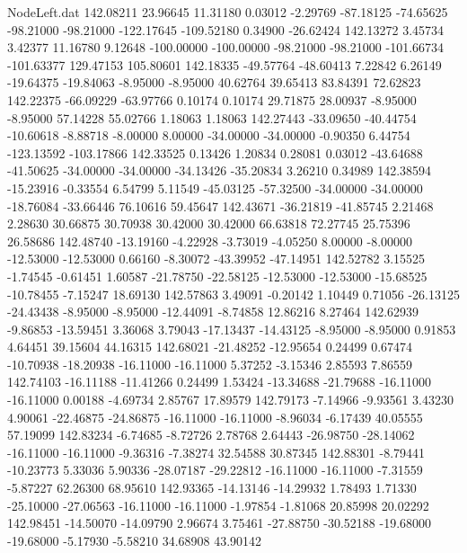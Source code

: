 \begin{filecontents}{NodeLeft.dat}
 142.08211   23.96645   11.31180     0.03012   -2.29769  -87.18125  -74.65625  -98.21000  -98.21000 -122.17645 -109.52180    0.34900  -26.62424
 142.13272    3.45734    3.42377    11.16780    9.12648 -100.00000 -100.00000  -98.21000  -98.21000 -101.66734 -101.63377  129.47153  105.80601
 142.18335  -49.57764  -48.60413     7.22842    6.26149  -19.64375  -19.84063   -8.95000   -8.95000   40.62764   39.65413   83.84391   72.62823
 142.22375  -66.09229  -63.97766     0.10174    0.10174   29.71875   28.00937   -8.95000   -8.95000   57.14228   55.02766    1.18063    1.18063
 142.27443  -33.09650  -40.44754   -10.60618   -8.88718   -8.00000    8.00000  -34.00000  -34.00000   -0.90350    6.44754 -123.13592 -103.17866
 142.33525    0.13426    1.20834     0.28081    0.03012  -43.64688  -41.50625  -34.00000  -34.00000  -34.13426  -35.20834    3.26210    0.34989
 142.38594  -15.23916   -0.33554     6.54799    5.11549  -45.03125  -57.32500  -34.00000  -34.00000  -18.76084  -33.66446   76.10616   59.45647
 142.43671  -36.21819  -41.85745     2.21468    2.28630   30.66875   30.70938   30.42000   30.42000   66.63818   72.27745   25.75396   26.58686
 142.48740  -13.19160   -4.22928    -3.73019   -4.05250    8.00000   -8.00000  -12.53000  -12.53000    0.66160   -8.30072  -43.39952  -47.14951
 142.52782    3.15525   -1.74545    -0.61451    1.60587  -21.78750  -22.58125  -12.53000  -12.53000  -15.68525  -10.78455   -7.15247   18.69130
 142.57863    3.49091   -0.20142     1.10449    0.71056  -26.13125  -24.43438   -8.95000   -8.95000  -12.44091   -8.74858   12.86216    8.27464
 142.62939   -9.86853  -13.59451     3.36068    3.79043  -17.13437  -14.43125   -8.95000   -8.95000    0.91853    4.64451   39.15604   44.16315
 142.68021  -21.48252  -12.95654     0.24499    0.67474  -10.70938  -18.20938  -16.11000  -16.11000    5.37252   -3.15346    2.85593    7.86559
 142.74103  -16.11188  -11.41266     0.24499    1.53424  -13.34688  -21.79688  -16.11000  -16.11000    0.00188   -4.69734    2.85767   17.89579
 142.79173   -7.14966   -9.93561     3.43230    4.90061  -22.46875  -24.86875  -16.11000  -16.11000   -8.96034   -6.17439   40.05555   57.19099
 142.83234   -6.74685   -8.72726     2.78768    2.64443  -26.98750  -28.14062  -16.11000  -16.11000   -9.36316   -7.38274   32.54588   30.87345
 142.88301   -8.79441  -10.23773     5.33036    5.90336  -28.07187  -29.22812  -16.11000  -16.11000   -7.31559   -5.87227   62.26300   68.95610
 142.93365  -14.13146  -14.29932     1.78493    1.71330  -25.10000  -27.06563  -16.11000  -16.11000   -1.97854   -1.81068   20.85998   20.02292
 142.98451  -14.50070  -14.09790     2.96674    3.75461  -27.88750  -30.52188  -19.68000  -19.68000   -5.17930   -5.58210   34.68908   43.90142

\end{filecontents}
